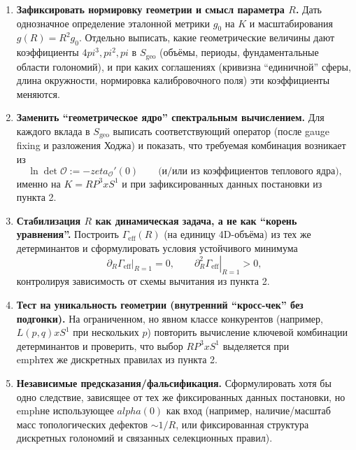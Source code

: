 \documentclass[12pt]{article}
\def\mathbb#1{#1}%
\def\alpha{alpha}%
\def\pi{pi}%
\def\times{x}%
\def\zeta{zeta}%
\begin{document}
\begin{enumerate}
  \item \textbf{Зафиксировать нормировку геометрии и смысл параметра $R$.}
  Дать однозначное определение эталонной метрики $g_0$ на $K$ и масштабирования $g(R)=R^2 g_0$.
  Отдельно выписать, какие геометрические величины дают коэффициенты $4\pi^3,\pi^2,\pi$ в $S_{\mathrm{geo}}$ (объёмы, периоды, фундаментальные области голономий), и при каких соглашениях (кривизна ``единичной'' сферы, длина окружности, нормировка калибровочного поля) эти коэффициенты меняются.

  \item \textbf{Заменить ``геометрическое ядро'' спектральным вычислением.}
  Для каждого вклада в $S_{\mathrm{geo}}$ выписать соответствующий оператор (после gauge fixing и разложения Ходжа) и показать, что требуемая комбинация возникает из
  \begin{equation}
    \ln\det \mathcal{O}:= -\zeta_{\mathcal{O}}'(0)
    \qquad\text{(и/или из коэффициентов теплового ядра),}
  \end{equation}
  именно на $K=\mathbb{RP}^3\times S^1$ и при зафиксированных данных постановки из пункта 2.

  \item \textbf{Стабилизация $R$ как динамическая задача, а не как ``корень уравнения''.}
  Построить $\Gamma_{\mathrm{eff}}(R)$ (на единицу 4D-объёма) из тех же детерминантов и сформулировать условия устойчивого минимума
  $$\left.\partial_R \Gamma_{\mathrm{eff}}\right|_{R=1}=0,\qquad \left.\partial_R^2 \Gamma_{\mathrm{eff}}\right|_{R=1}>0,$$
  контролируя зависимость от схемы вычитания из пункта 2.

  \item \textbf{Тест на уникальность геометрии (внутренний ``кросс-чек'' без подгонки).}
  На ограниченном, но явном классе конкурентов (например, $L(p,q)\times S^1$ при нескольких $p$) повторить вычисление ключевой комбинации детерминантов и проверить, что выбор $\mathbb{RP}^3\times S^1$ выделяется при \\emph{тех же} дискретных правилах из пункта 2.

  \item \textbf{Независимые предсказания/фальсификация.}
  Сформулировать хотя бы одно следствие, зависящее от тех же фиксированных данных постановки, но \\emph{не} использующее $\alpha(0)$ как вход (например, наличие/масштаб масс топологических дефектов $\sim 1/R$, или фиксированная структура дискретных голономий и связанных селекционных правил).
\end{enumerate}
\end{document}
